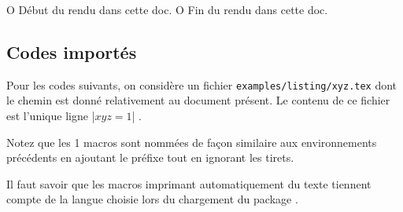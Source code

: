 

\usepackage[lang = FR]{../main/main}
\usepackage{../macroenv/macroenv}
\usepackage{../inenglish/inenglish}
\usepackage{../showcase/showcase}
\usepackage{../rem-exa/rem-exa}

\usepackage{listing}





                       { O{ Début du rendu dans cette doc. }
                         O{ Fin du rendu dans cette doc. } }{
    \begin{colorstrip}{green!5}
        \smallskip
}{
        \smallskip
        \bdocextraruler{#2}
    \end{colorstrip}
}





\subsection{Codes importés}

Pour les codes suivants, on considère un fichier \verb+examples/listing/xyz.tex+ dont le chemin est donné relativement au document présent.
Le contenu de ce fichier est l'unique ligne \bdocinlatex|$x y z = 1$| .

\medskip

Notez que les 1\ieres{} macros sont nommées de façon similaire aux environnements précédents en ajoutant le préfixe  tout en ignorant les tirets.


\begin{bdocrem}
    Il faut savoir que les macros imprimant automatiquement du texte tiennent compte de la langue choisie lors du chargement du package .
\end{bdocrem}


